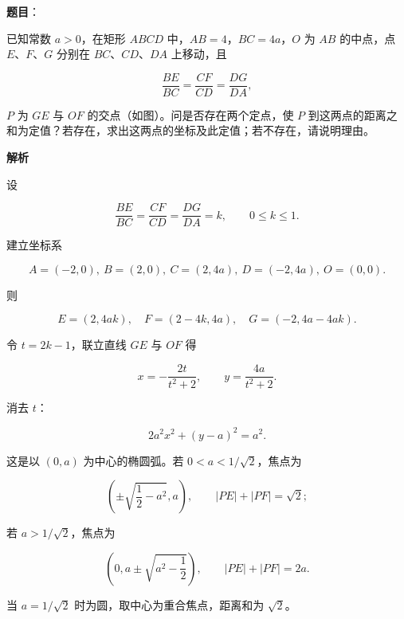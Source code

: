 \begin{answer}

\textbf{题目}：

已知常数 $a>0$，在矩形 $ABCD$ 中，$AB=4$，$BC=4a$，$O$ 为 $AB$ 的中点，点 $E\text{、}F\text{、}G$ 分别在 $BC\text{、}CD\text{、}DA$ 上移动，且

\nopagebreak[4]
\[
\frac{BE}{BC}=\frac{CF}{CD}=\frac{DG}{DA},
\]

$P$ 为 $GE$ 与 $OF$ 的交点（如图）。问是否存在两个定点，使 $P$ 到这两点的距离之和为定值？若存在，求出这两点的坐标及此定值；若不存在，请说明理由。
\nopagebreak[4]
\begin{center}\end{center}
\nopagebreak[4]
\textbf{解析}

设

\nopagebreak[4]
\[
\frac{BE}{BC}=\frac{CF}{CD}=\frac{DG}{DA}=k,
\qquad 0\leqslant k\leqslant1.
\]

建立坐标系

\nopagebreak[4]
\[
A=(-2,0),\ B=(2,0),\ C=(2,4a),\ D=(-2,4a),\ O=(0,0).
\]

则

\nopagebreak[4]
\[
E=(2,4ak),\quad F=(2-4k,4a),\quad G=(-2,4a-4ak).
\]

令 $t=2k-1$，联立直线 $GE$ 与 $OF$ 得

\nopagebreak[4]
\[
x=-\frac{2t}{t^2+2},\qquad y=\frac{4a}{t^2+2}.
\]

消去 $t$：

\nopagebreak[4]
\[
2a^2x^2+(y-a)^2=a^2.
\]

这是以 $(0,a)$ 为中心的椭圆弧。若 $0<a<1/\sqrt2$，焦点为

\nopagebreak[4]
\[
\left(\pm\sqrt{\frac12-a^2},a\right),
\qquad |PE|+|PF|=\sqrt2;
\]

若 $a>1/\sqrt2$，焦点为

\nopagebreak[4]
\[
\left(0,a\pm\sqrt{a^2-\frac12}\right),
\qquad |PE|+|PF|=2a.
\]

当 $a=1/\sqrt2$ 时为圆，取中心为重合焦点，距离和为 $\sqrt2$。


\end{answer}